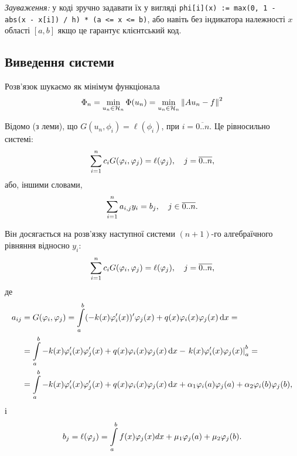 \textit{Зауваження:} у коді зручно задавати їх у вигляді \texttt{phi[i](x) := max(0, 1 - abs(x - x[i]) / h) * (a <= x <= b)}, або навіть без індикатора належності $x$ області $[a, b]$ якщо це гарантує клієнтський код. \medskip

\subsection{Виведення системи}

Розв'язок шукаємо як мінімум функціонала
\begin{equation}
    \label{eq:2.1.5}
    \Phi_n = \operatorname*{min}_{u_n \in \mathcal{H}_n} \Phi (u_n) = \operatorname*{min}_{u_n \in \mathcal{H}_n} \left\| A u_n - f \right\|^2 
\end{equation}

Відомо (з леми), що $G(u_n, \phi_i) = \ell(\phi_i)$, при $i = \overline{0..n}$. Це рівносильно системі:
\begin{equation}
    \label{eq:2.1.6}
    \displaystyle\sum\limits_{i = 1}^n c_i G(\varphi_i, \varphi_j) = \ell(\varphi_j), \quad j = \overline{0..n},
\end{equation}
або, іншими словами,
\begin{equation}
    \label{eq:2.1.7}
    \displaystyle\sum\limits_{i = 1}^n a_{i,j} y_i = b_j, \quad j \in \overline{0..n}.
\end{equation}

Він досягається на розв'язку наступної системи $(n+1)$-го алгебраїчного рівняння відносно $y_i$:
\begin{equation}
    \label{eq:2.1.8}
    \displaystyle\sum\limits_{i = 1}^n c_i G(\varphi_i, \varphi_j) = \ell(\varphi_j), \quad j = \overline{0..n},
\end{equation}
де
\begin{equation}
    \label{eq:2.1.9}
    \begin{aligned}
        a_{ij} &= G(\phi_i, \phi_j) = \Int_a^b (-k(x) \phi_i'(x))' \phi_j(x) + q(x) \phi_i(x) \phi_j(x) \diff x = \\
        &= \Int_a^b -k(x) \phi_i'(x) \phi_j'(x) + q(x) \phi_i(x) \phi_j(x)  \diff x - \left. k(x) \phi_i'(x) \phi_j(x) \right|_a^b = \\
        &= \Int_a^b -k(x) \phi_i'(x) \phi_j'(x) + q(x) \phi_i(x) \phi_j(x) \diff x + \alpha_1 \phi_i(a) \phi_j(a) %
        + \alpha_2 \phi_i(b) \phi_j(b) %
        ,
    \end{aligned}
\end{equation}
і
\begin{equation}
    \label{eq:2.1.10}
    b_j = \ell(\varphi_j) = \displaystyle\int\limits_a^b f(x) \varphi_j(x) dx + \mu_1 \varphi_j(a) + \mu_2 \varphi_j(b).
\end{equation}


